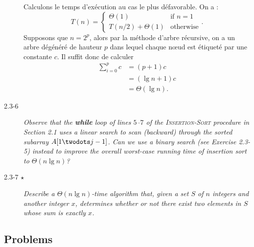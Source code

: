 \begin{description}
\begin{ex}
    Calculons le temps d'ex\'ecution au cas le plus d\'efavorable. On a :
    $$T(n) = \left\{ 
      \begin{array}{ll}
        \Theta(1) & \text{if } n = 1\\
        T(n/2) + \Theta(1) & \text{otherwise}
      \end{array}
    \right..$$
    Supposons que $n = 2^p$, alors par la m\'ethode d'arbre r\'ecursive, on a un arbre d\'eg\'en\'er\'e de hauteur $p$ dans lequel chaque n\oe ud est \'etiquet\'e par une constante $c$. Il suffit donc de calculer 
    \begin{align*}
      \sum_{i=0}^{p}c &= (p+1)c\\
     &= (\lg n + 1)c\\
     &= \Theta(\lg n).
    \end{align*}
  \end{ex}

\item[2.3-6] {\itshape Observe that the {\bfseries while} loop of lines $5$–$7$ of the {\scshape Insertion-Sort} procedure in Section 2.1 uses a linear search to scan (backward) through the sorted subarray $A[1 \twodots j-1]$. Can we use a binary search (see Exercise 2.3-5) instead to improve the overall worst-case running time of insertion sort to $\Theta(n \lg n)$?}

  \begin{exrev}
    
  \end{exrev}

\item[2.3-7 $\star$] {\itshape Describe a $\Theta (n \lg n)$-time algorithm that, given a set $S$ of $n$ integers and another integer $x$, determines whether or not there exist two elements in $S$ whose sum is exactly $x$.}

  \begin{exrev}
    
  \end{exrev}

\end{description}

\subsection{Problems}

